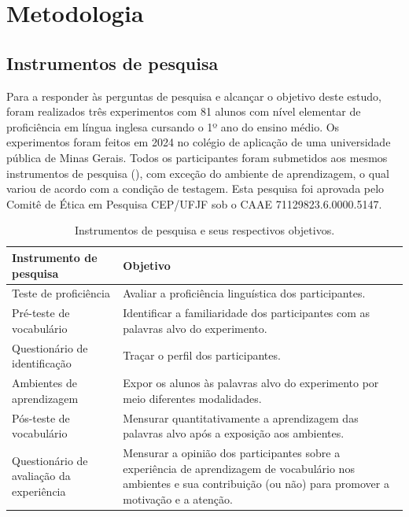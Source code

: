 \section{Metodologia}\label{sec-metodologia}

\subsection{Instrumentos de pesquisa}

Para a responder às perguntas de pesquisa e alcançar o objetivo deste
estudo, foram realizados três experimentos com 81 alunos com nível
elementar de proficiência em língua inglesa cursando o 1º ano do ensino
médio. Os experimentos foram feitos em 2024 no colégio de aplicação de
uma universidade pública de Minas Gerais. Todos os participantes foram
submetidos aos mesmos instrumentos de pesquisa (), com exceção
do ambiente de aprendizagem, o qual variou de acordo com a condição de
testagem. Esta pesquisa foi aprovada pelo Comitê de Ética em Pesquisa
CEP/UFJF sob o CAAE 71129823.6.0000.5147.

\begin{table}[htpb]
    \centering
    \begin{threeparttable}
    \caption{Instrumentos de pesquisa e seus respectivos objetivos.}
    \label{tab-01}
        \begin{tabular}{p{} p{}}
            \toprule
            Instrumento de pesquisa & Objetivo \\
            \midrule
            Teste de proficiência & Avaliar a proficiência linguística dos
            participantes. \\
            Pré-teste de vocabulário & Identificar a familiaridade dos participantes
            com as palavras alvo do experimento. \\
            Questionário de identificação & Traçar o perfil dos participantes. \\
            Ambientes de aprendizagem & Expor os alunos às palavras alvo do
            experimento por meio diferentes modalidades. \\
            Pós-teste de vocabulário & Mensurar quantitativamente a aprendizagem das
            palavras alvo após a exposição aos ambientes. \\
            Questionário de avaliação da experiência & Mensurar a opinião dos
            participantes sobre a experiência de aprendizagem de vocabulário nos
            ambientes e sua contribuição (ou não) para promover a motivação e a
            atenção. \\
            \bottomrule
        \end{tabular}
    \end{threeparttable}
\end{table}

